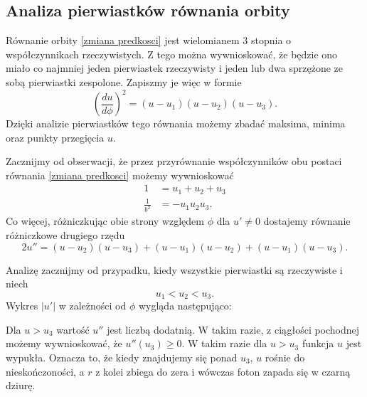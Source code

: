 \subsection{Analiza pierwiastków równania orbity}

Równanie orbity \ref{zmiana predkosci} jest wielomianem $3$ stopnia o współczynnikach rzeczywistych. Z tego można wywnioskować, że będzie ono miało co najmniej jeden pierwiastek rzeczywisty i jeden lub dwa sprzężone ze sobą pierwiastki zespolone. Zapiszmy je więc w formie
$$\left(\frac{du}{d\phi}\right)^2=(u-u_1)(u-u_2)(u-u_3).$$
Dzięki analizie pierwiastków tego równania możemy zbadać maksima, minima oraz punkty przegięcia $u$.

Zacznijmy od obserwacji, że przez przyrównanie współczynników obu postaci równania \ref{zmiana predkosci} możemy wywnioskować
\begin{align*}
  1&=u_1+u_2+u_3\\
  \frac{1}{b^2}&=-u_1u_2u_3.
\end{align*}
Co więcej, różniczkując obie strony względem $\phi$ dla $u'\neq 0$ dostajemy równanie różniczkowe drugiego rzędu
$$2u''=(u-u_2)(u-u_3)+(u-u_1)(u-u_2)+(u-u_1)(u-u_3).$$

Analizę zacznijmy od przypadku, kiedy wszystkie pierwiastki są rzeczywiste i niech 
$$u_1<u_2<u_3.$$ 
Wykres $|u'|$ w zależności od $\phi$ wygląda następująco:
\begin{center}
\end{center}

Dla $u>u_3$ wartość $u''$ jest liczbą dodatnią. W takim razie, z ciągłości pochodnej możemy wywnioskować, że $u''(u_3)\geq0$. W takim razie dla $u>u_3$ funkcja $u$ jest wypukła. Oznacza to, że kiedy znajdujemy się ponad $u_3$, $u$ rośnie do nieskończoności, a $r$ z kolei zbiega do zera i wówczas foton zapada się w czarną dziurę. 

